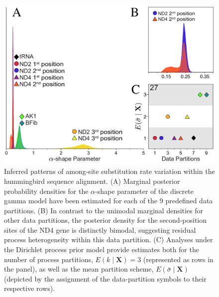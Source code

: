 \documentclass[11pt]{article}
\begin{document}
\begin{figure}[h] 
\centering 
\includegraphics[width=120mm]{figures/figure_1.pdf} 
\caption{Inferred patterns of among-site substitution rate variation within the hummingbird sequence alignment.  (A) Marginal posterior probability densities for the $\alpha$-shape parameter of the discrete gamma model have been estimated for each of the 9 predefined data partitions.  (B) In contrast to the unimodal marginal densities for other data partitions, the posterior density for the second-position sites of the ND4 gene is distinctly bimodal, suggesting residual process heterogeneity within this data partition.  (C) Analyses under the Dirichlet process prior model provide estimates both for the number of process partitions, $E(k \mid \mathbf{X}) = 3$ (represented as rows in the panel), as well as the mean partition scheme, $E(\bar{\sigma} \mid \mathbf{X})$ (depicted by the assignment of the data-partition symbols to their respective rows).}
\label{results_example}
\end{figure} 

\newpage
\end{document}

